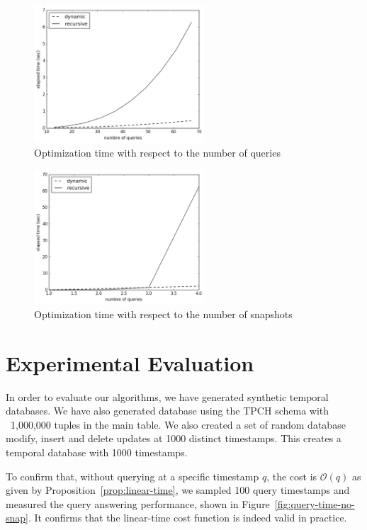 \begin{figure}[tb]
    \label{fig:plan-time-n}
    \centering
    \includegraphics[width=2.5in]{figs/multiquery_runtime.pdf}
    \caption{Optimization time with respect to the number of queries}
\end{figure}


\begin{figure}[tb]
    \label{fig:plan-time-m}
    \centering
    \includegraphics[width=2.5in]{figs/multisnap_runtime.pdf}
    \caption{Optimization time with respect to the number of snapshots}
\end{figure}




\section{Experimental Evaluation}

In order to evaluate our algorithms, we have generated synthetic temporal 
databases.  We have also generated database using the TPCH schema with
~1,000,000 tuples in the main table.  We also created a set of random database
modify, insert and delete updates at 1000 distinct timestamps.  This creates a
temporal database with 1000 timestamps.

To confirm that, without querying at a specific timestamp $q$, the cost is
$\mathcal{O}(q)$ as given by Proposition~\ref{prop:linear-time}, we sampled
100 query timestamps and measured the query answering performance, shown in
Figure~\ref{fig:query-time-no-snap}.  It confirms that the linear-time cost
function is indeed valid in practice.


